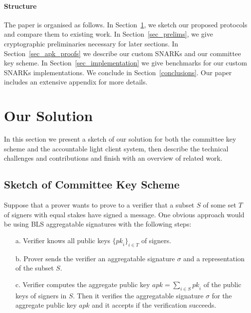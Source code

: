 \paragraph{Structure} The paper is organised as follows. 
In Section~\ref{sec:sketch}, we sketch our proposed protocols and compare 
them to existing work. In Section~\ref{sec_prelims}, we give cryptographic 
preliminaries necessary for later sections. In Section~\ref{sec_apk_proofs}
we describe our custom SNARKs and our committee key scheme. In 
Section~\ref{sec_implementation} we give benchmarks for our custom SNARKs 
implementations. We conclude in Section~\ref{conclusions}. Our paper includes 
an extensive appendix for more details.%
\vspace{-0.25cm}
\section{Our Solution} 
\label{sec:sketch}
\vspace{-0.1cm}

In this section we present a sketch of our solution for both the committee key scheme and the accountable light client system, 
then describe the technical challenges and contributions and finish with an overview of related work.

\vspace{-0.3cm}
\subsection{Sketch of Committee Key Scheme}
\label{sec:lcsketch}
\vspace{-0.1cm}

\noindent Suppose that a prover wants to prove to a verifier that a subset $S$ of some set $T$ of signers {\color{red} with equal stakes} have signed a message. 
One obvious approach would be using BLS aggregatable signatures with the following steps:

\begin{itemize}
\item[a.] Verifier knows all public keys $\{\mathit{pk}_i\}_{i \in T}$ of signers.%

\item[b.] Prover sends the verifier an aggregatable signature $\sigma$ and a representation of the subset $S$.

\item[c.] Verifier computes the aggregate public key $\mathit{apk}=\sum_{i \in S} \mathit{pk}_i$ of the public keys of signers in $S$. 
Then it verifies the aggregatable signature $\sigma$ for the aggregate public key $\mathit{apk}$ and it accepts if the verification succeeds.
\end{itemize}

